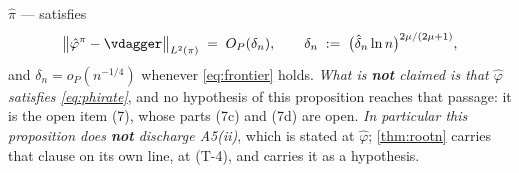 \begin{proposition}
$\hat\pi$ --- satisfies
\begin{equation}\label{eq:phirate}
\big\|\hat\varphi^{\pi}-\vdagger\big\|_{L^{2}(\pi)}\;=\;O_P(\delta_n),
\qquad
\delta_n\;:=\;\big(\hat\delta_n\ln n\big)^{2\mu/(2\mu+1)} ,
\end{equation}
and $\delta_n=o_P(n^{-1/4})$ whenever \eqref{eq:frontier} holds.
\emph{What is \textbf{not} claimed is that $\hat\varphi$ satisfies \eqref{eq:phirate}}, and no hypothesis
of this proposition reaches that passage: it is the open item \textup{(7)},
whose parts \textup{(7c)} and \textup{(7d)} are open. \emph{In particular this proposition does
\textbf{not} discharge A5(ii)}, which is stated at $\hat\varphi$; \cref{thm:rootn} carries that clause on
its own line, at \textup{(T-4)}, and carries it as a hypothesis.

\end{proposition}
